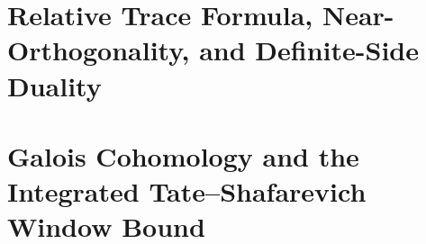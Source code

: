 \part{Relative Trace Formula, Near-Orthogonality, and Definite-Side Duality}




\part{Galois Cohomology and the Integrated Tate--Shafarevich Window Bound}




\appendix



\backmatter

